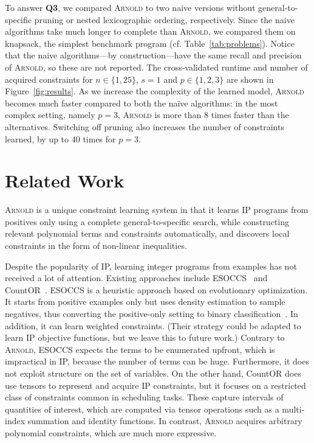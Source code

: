 \documentclass{article}
\newcommand{\learner}{\textsc{Arnold}\xspace}
\renewcommand\[{\begin{equation}}
\renewcommand\]{\end{equation}}
\begin{document}
To answer \textbf{Q3}, we compared \learner to two naive versions without
general-to-specific pruning or nested lexicographic ordering, respectively.
%
Since the naive algorithms take much longer to complete than \learner, we
compared them on knapsack, the simplest benchmark program (cf.
Table~\ref{tab:problems}).
%
Notice that the naive algorithms---by construction---have the same recall and
precision of \learner, so these are not reported.
%
The cross-validated runtime and number of acquired constraints for $n \in \{1,
25\}$, $s = 1$ and $p \in \{1, 2, 3\}$ are shown in Figure~\ref{fig:results}.
As we increase the complexity of the learned model, \learner becomes much
faster compared to both the na\"ive algorithms: in the most complex setting,
namely $p = 3$, \learner is more than 8 times faster than the alternatives.
Switching off pruning also increases the number of
constraints learned, by up to $40$ times for $p = 3$.


\section{Related Work}

\learner is a unique constraint learning system in that it learns IP programs
from positives only using a complete general-to-specific search, while
constructing relevant polynomial terms and constraints automatically, and
discovers local constraints in the form of non-linear inequalities.

Despite the popularity of IP, learning integer programs from examples has not
received a lot of attention.  Existing approaches include
ESOCCS~\cite{pawlak2019synthesis} and CountOR~\cite{kumar2018constraint}.
%
ESOCCS is a heuristic approach based on evolutionary optimization.  It starts
from positive examples only but uses density estimation to sample negatives,
thus converting the positive-only setting to binary
classification~\cite{pawlak2017automatic}.  In addition, it can learn weighted
constraints.  (Their strategy could be adapted to learn IP objective functions,
but we leave this to future work.) Contrary to \learner, ESOCCS expects the
terms to be enumerated upfront, which is impractical in IP, because the number
of terms can be huge.  Furthermore, it does not exploit structure on the set of
variables.
%
On the other hand, CountOR does use tensors to represent and acquire IP
constraints, but it focuses on a restricted class of constraints common in
scheduling tasks.  These capture intervals of quantities of interest, which are
computed via tensor operations such as a multi-index summation and identity
functions.  In contrast, \learner acquires arbitrary polynomial constraints,
which are much more expressive.
\end{document}
